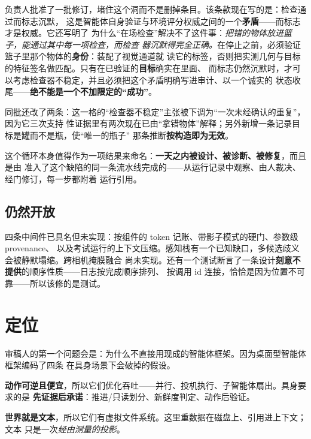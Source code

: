 \documentclass[11pt,a4paper,UTF8,fontset=macnew]{ctexrep}
\newcommand{\keyrule}[1]{\textbf{\textcolor{acc}{#1}}}
\begin{document}
\begin{resolved}[title={当天修复，而且是通过产生它的那道门}]
负责人批准了一批修订，堵住这个洞而不是删掉条目。该条款现在写的是：检查通过而标志沉默，
这是智能体自身验证与环境评分权威之间的一个\textbf{矛盾}——而标志才是权威。它还写明了
为什么“在场检查”解决不了这件事：\emph{把错的物体放进篮子，能通过其中每一项检查，而检查
器沉默得完全正确。}在停止之前，必须验证篮子里那个物体的\textbf{身份}：装配了视觉通道就
读它的标签，否则把实测几何与目标的特征签名做匹配。只有在已验证的\textbf{目标}确实在里面、
而标志仍然沉默时，才可以考虑检查器不稳定，并且必须把这个矛盾明确写进审计、以一个诚实的
状态收尾——\textbf{绝不能是一个不加限定的“成功”}。

同批还改了两条：这一格的“检查器不稳定”主张被下调为“一次未经确认的重复”，因为它三次支持
性证据里有两次现在已由“拿错物体”解释；另外新增一条记录目标是罐而不是瓶，使“唯一的瓶子”
那条推断\textbf{按构造即为无效}。
\end{resolved}

\noindent
这个循环本身值得作为一项结果来命名：\textbf{一天之内被设计、被诊断、被修复}，而且是由
准入了这个缺陷的同一条流水线完成的——从运行记录中观察、由人裁决、经门修订，每一步都附着
运行引用。

\section{仍然开放}

四条中间件已具名但未实现：按组件的 token 记账、带影子模式的硬门、参数级 provenance、
以及考试运行的上下文压缩。感知栈有一个已知缺口，多候选歧义会被静默塌缩。跨相机掩膜融合
尚未实现。还有一个测试断言了一条设计\textbf{刻意不提供}的顺序性质——日志按完成顺序排列、
按调用 id 连接，恰恰是因为位置不可靠——所以该修的是测试。

\chapter{定位}

审稿人的第一个问题会是：为什么不直接用现成的智能体框架。因为桌面型智能体框架编码了四条
在具身场景下会破掉的假设。

\keyrule{动作可逆且便宜}，所以它们优化吞吐——并行、投机执行、子智能体扇出。具身要求的是
\textbf{先证据后承诺}：推进/只读划分、新鲜度判定、动作后验证。

\keyrule{世界就是文本}，所以它们有虚拟文件系统。这里重数据在磁盘上、引用进上下文；文本
只是一次\emph{经由测量的投影}。
\end{document}
